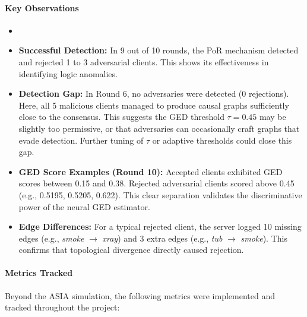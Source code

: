 \documentclass[journal]{IEEEtran}
\begin{document}
\paragraph{Key Observations}

\begin{itemize}
\item  \item \textbf{Successful Detection:} In 9 out of 10 rounds, the PoR mechanism detected and rejected 1 to 3 adversarial clients. This shows its effectiveness in identifying logic anomalies. \item \textbf{Detection Gap:} In Round 6, no adversaries were detected (0 rejections). Here, all 5 malicious clients managed to produce causal graphs sufficiently close to the consensus. This suggests the GED threshold $\tau = 0.45$ may be slightly too permissive, or that adversaries can occasionally craft graphs that evade detection. Further tuning of $\tau$ or adaptive thresholds could close this gap. \item \textbf{GED Score Examples (Round 10):} Accepted clients exhibited GED scores between 0.15 and 0.38. Rejected adversarial clients scored above 0.45 (e.g., 0.5195, 0.5205, 0.622). This clear separation validates the discriminative power of the neural GED estimator. \item \textbf{Edge Differences:} For a typical rejected client, the server logged 10 missing edges (e.g., \textit{smoke} $\rightarrow$ \textit{xray}) and 3 extra edges (e.g., \textit{tub} $\rightarrow$ \textit{smoke}). This confirms that topological divergence directly caused rejection. \end{itemize}

\paragraph{Metrics Tracked}

Beyond the ASIA simulation, the following metrics were implemented and tracked throughout the project:
\end{document}
